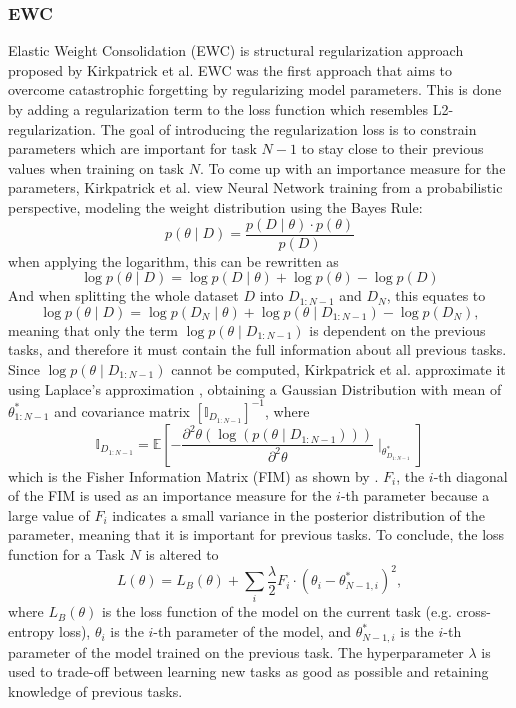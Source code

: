 \subsubsection{EWC}
Elastic Weight Consolidation (EWC) \cite{kirkpatrick2017overcoming} is structural regularization approach proposed by Kirkpatrick et al.
EWC was the first approach that aims to overcome catastrophic forgetting by regularizing model parameters. This is done by adding a regularization
term to the loss function which resembles L2-regularization. The goal of introducing the regularization loss is to constrain parameters which
are important for task $N-1$ to stay close to their previous values when training on task $N$. To come up with an importance measure for the parameters,
Kirkpatrick et al. view  Neural Network training from a probabilistic perspective, modeling the weight distribution using the Bayes Rule:
\begin{equation}
    p(\theta \mid D) = \frac{p(D \mid \theta) \cdot p(\theta)}{p(D)}
\end{equation}
when applying the logarithm, this can be rewritten as
\begin{equation}
    \log p(\theta \mid D) = \log p(D \mid \theta) + \log p(\theta) - \log p(D)
\end{equation}
And when splitting the whole dataset $D$ into $D_{1:N-1}$ and $D_N$, this equates to
\begin{equation}
    \log p(\theta \mid D) = \log p(D_N \mid \theta) + \log p(\theta \mid D_{1:N-1}) - \log p(D_N),
\end{equation}
meaning that only the term $\log p(\theta \mid D_{1:N-1})$ is dependent on the previous tasks, and therefore it must contain the full information 
about all previous tasks. Since $\log p(\theta \mid D_{1:N-1})$ cannot be computed, Kirkpatrick et al. approximate it using Laplace's approximation
\cite{mackay2003information}, obtaining a Gaussian Distribution with mean of $\theta^*_{1:N-1}$ and covariance matrix $[\mathbb{I}_{D_{1:N-1}}]^{-1}$,
where
\begin{equation}
    \mathbb{I}_{D_{1:N-1}} = \mathbb{E} [- \frac{\partial^2 \theta (\log (p(\theta \mid D_{1:N-1})))}{\partial^2 \theta} \mid_{\theta^*_{D_{1:N-1}}}]
\end{equation} 
which is the Fisher Information Matrix (FIM) as shown by \cite{aich2021elastic}. $F_i$, the $i$-th diagonal of the FIM is used as an importance measure
for the $i$-th parameter because a large value of $F_i$ indicates a small variance in the posterior distribution of the parameter, meaning that it is
important for previous tasks. To conclude, the loss function for a Task $N$ is altered to
\begin{equation}
    L(\theta) = L_B(\theta) + \sum_i \frac{\lambda}{2} F_i \cdot (\theta_i - \theta^*_{N-1,i})^2,
\end{equation}
where $L_B(\theta)$ is the loss function of the model on the current task (e.g. cross-entropy loss), $\theta_i$ is the $i$-th parameter of the model,
and $\theta^*_{N-1,i}$ is the $i$-th parameter of the model trained on the previous task. The hyperparameter $\lambda$ is used to trade-off between
learning new tasks as good as possible and retaining knowledge of previous tasks.

